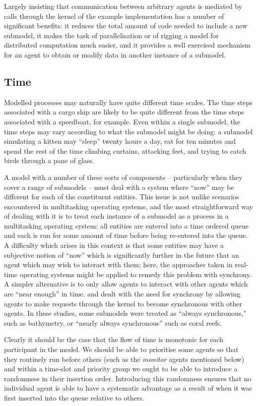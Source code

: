 Largely insisting that communication between arbitrary agents is
mediated by calls through the kernel of the example implementation has
a number of significant benefits: it reduces the total amount of code
needed to include a new submodel, it makes the task of
parallelisation or of rigging a model for distributed computation much
easier, and it provides a well exercised mechanism for an agent to
obtain or modify data in another instance of a submodel.

\subsection{Time}
Modelled processes may naturally have quite different time
scales. The time steps associated with a cargo ship are likely to be
quite different from the time steps associated with a speedboat, for
example. Even within a single submodel, the time steps may vary
according to what the submodel might be doing: a submodel simulating
a kitten may ``sleep'' twenty hours a day, eat for ten minutes and 
spend the rest of the time climbing curtains, attacking feet, and
trying to catch birds through a pane of glass.

A model with a number of these sorts of components -- particularly
when they cover a range of submodels -- must deal with a system where
``now'' may be different for each of the constituent entities. This
issue is not unlike scenarios encountered in multitasking operating
systems, and the most straightforward way of dealing with it is to
treat each instance of a submodel as a process in a multitasking
operating system: all entities are entered into a time ordered queue
and each is run for some amount of time before being re-entered into
the queue.  A difficulty which arises in this context is that some
entities may have a subjective notion of ``now'' which is
significantly further in the future that an agent which may
wish to interact with them; here, the approaches taken in real-time
operating systems might be applied to remedy this problem with
synchrony.  A simpler alternative is to only allow agents to interact
with other agents which are ``near enough'' in time. \Cite{gray2014}
and \Cite{gray2006nws} dealt with the need for synchrony by allowing
agents to make requests through the kernel to become synchronous with
other agents.  In these studies, some submodels were treated as
``always synchronous,'' such as bathymetry, or ``nearly always
synchronous'' such as coral reefs.

Clearly it should be the case that the flow of time is monotonic for
each participant in the model. We should be able to prioritise some
agents so that they routinely run before others (such as
the \textit{monitor} agents mentioned below) and within a time-slot
and priority group we ought to be able to introduce a randomness in
their insertion order.  Introducing this randomness ensures that no
individual agent is able to have a systematic advantage as a result of
when it was first inserted into the queue relative to others.

